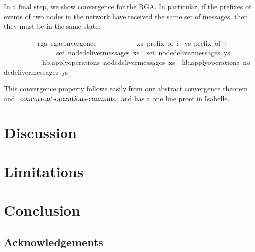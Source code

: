 \documentclass[acmlarge,review,anonymous]{acmart}\settopmatter{printfolios=true}
\begin{document}
\vspace{\baselineskip}
In a final step, we show convergence for the RGA.
In particular, if the prefixes of events of two nodes in the network have received the same set of messages, then they must be in the same state:
\isanewline
\begin{isabellebody}
\ \ \ \ \ \ \ \  {\isacharparenleft}\ rga{\isacharparenright}\ rga{\isacharunderscore}convergence{\isacharcolon}\isanewline
\ \ \ \ \ \ \ \ \ \ \ {\isachardoublequoteopen}xs\ prefix\ of\ i{\isachardoublequoteclose} \ {\isachardoublequoteopen}ys\ prefix\ of\ j{\isachardoublequoteclose}\isanewline
\ \ \ \ \ \ \ \ \ \ \ \ \ \ \ {\isachardoublequoteopen}set\ {\isacharparenleft}node{\isacharunderscore}deliver{\isacharunderscore}messages\ xs{\isacharparenright}\ {\isacharequal}\ set\ {\isacharparenleft}node{\isacharunderscore}deliver{\isacharunderscore}messages\ ys{\isacharparenright}{\isachardoublequoteclose}\isanewline
\ \ \ \ \ \ \ \ \ \ \ {\isachardoublequoteopen}hb.apply{\isacharunderscore}operations\ {\isacharparenleft}node{\isacharunderscore}deliver{\isacharunderscore}messages\ xs{\isacharparenright}\ {\isacharequal}\ hb.apply{\isacharunderscore}operations\ {\isacharparenleft}node{\isacharunderscore}deliver{\isacharunderscore}messages\ ys{\isacharparenright}{\isachardoublequoteclose}
\end{isabellebody}
\vspace{\baselineskip}
This convergence property follows easily from our abstract convergence theorem and $\isa{concurrent-operations-commute}$, and has a one line proof in Isabelle.


\section{Discussion}
\label{sect.discussion}


\section{Limitations}
\label{sect.limitations}


\section{Conclusion}
\label{sect.conclusion}

\subsection*{Acknowledgements}

{}
\end{document}
